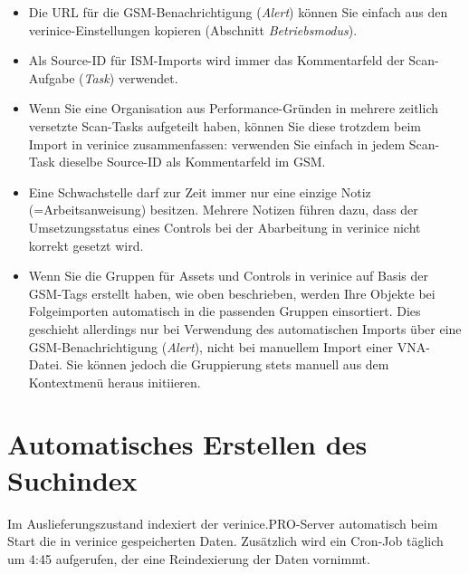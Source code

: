 \documentclass[a4paper,10pt]{book}
\begin{document}
\begin{itemize}
    \item Die URL für die GSM-Benachrichtigung ({\em Alert}) können Sie einfach aus den verinice-Einstellungen kopieren (Abschnitt {\em Betriebsmodus}).
    \item Als Source-ID für ISM-Imports wird immer das Kommentarfeld der Scan-Aufgabe ({\em Task}) verwendet.
    \item Wenn Sie eine Organisation aus Performance-Gründen in mehrere zeitlich versetzte Scan-Tasks aufgeteilt haben, können Sie diese trotzdem beim Import in verinice zusammenfassen: verwenden Sie einfach in jedem Scan-Task dieselbe Source-ID als Kommentarfeld im GSM.
    \item Eine Schwachstelle darf zur Zeit immer nur eine einzige Notiz (=Arbeitsanweisung) besitzen. Mehrere Notizen führen dazu, dass der Umsetzungsstatus eines Controls bei der Abarbeitung in verinice nicht korrekt gesetzt wird.
    \item Wenn Sie die Gruppen für Assets und Controls in verinice auf
    Basis der GSM-Tags erstellt haben, wie oben beschrieben, werden Ihre
    Objekte bei Folgeimporten automatisch in die passenden Gruppen
    einsortiert. Dies geschieht allerdings nur bei Verwendung des
    automatischen Imports über eine GSM-Benachrichtigung ({\em Alert}),
    nicht bei manuellem Import einer VNA-Datei. Sie können jedoch die
    Gruppierung stets manuell aus dem Kontextmenü heraus initiieren.
\end{itemize}

\section{Automatisches Erstellen des Suchindex}
\label{sec:indexing-mit-verinicepro}

Im Auslieferungszustand indexiert der verinice.PRO-Server automatisch
beim Start die in verinice gespeicherten Daten. Zusätzlich wird ein
Cron-Job täglich um 4:45 aufgerufen, der eine Reindexierung der Daten
vornimmt.
\end{document}
